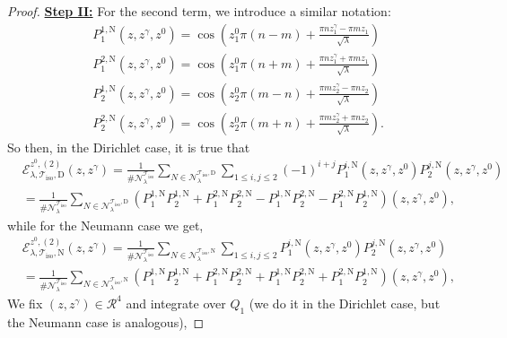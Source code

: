 \documentclass{amsart}
\theoremstyle{definition}
\theoremstyle{remark}
\renewcommand\leq\leqslant
\numberwithin{equation}{section}
\theoremstyle{definition}
\theoremstyle{remark}
\begin{document}
\begin{proof}
\textbf{	\underline{Step II:} }For the second term, we introduce a similar notation:
	\begin{equation}
		\begin{aligned}
			&	P_1^{1,\mathrm{N}}(z,z^\gamma,z^0)=\cos\left(z_1^0\pi(n-m)+\frac{\pi nz_1^\gamma-\pi mz_1}{\sqrt{\lambda}}\right) \\
			&	P_1^{2,\mathrm{N}}(z,z^\gamma,z^0)=\cos\left(z_1^0\pi(n+m)+\frac{\pi nz_1^\gamma+\pi mz_1}{\sqrt{\lambda}}\right) \\
			&	P_2^{1,\mathrm{N}}(z,z^\gamma,z^0)= \cos\left(z_2^0\pi(m-n)+\frac{\pi mz_2^\gamma-\pi nz_2}{\sqrt{\lambda}}\right)\\
			&	P_2^{2,\mathrm{N}}(z,z^\gamma,z^0)=\cos\left(z_2^0\pi(m+n)+\frac{\pi mz_2^\gamma+\pi nz_2}{\sqrt{\lambda}}\right) .
		\end{aligned}
	\end{equation} 
	So then, in the Dirichlet case, it is true that
	\begin{equation}
		\begin{aligned}
			&\mathcal{E}_{\lambda,\mathcal{T}_\mathrm{iso},\mathrm{D}}^{z^0,(2)}(z,z^\gamma)
			=\frac{1}{\#\mathcal{N}_\lambda^{\mathcal{T}_\mathrm{iso}}}\sum_{N\in\mathcal{N}_\lambda^{\mathcal{T}_\mathrm{iso},\mathrm{D}}}\sum_{1\leq i,j\leq 2}(-1)^{i+j}P_1^{i,\mathrm{N}}(z,z^\gamma,z^0)P_2^{j,\mathrm{N}}(z,z^\gamma,z^0)\\&=\frac{1}{\#\mathcal{N}_\lambda^{\mathcal{T}_\mathrm{iso}}}\sum_{N\in\mathcal{N}_\lambda^{\mathcal{T}_\mathrm{iso},\mathrm{D}}}\left(P_1^{1,\mathrm{N}}P_2^{1,\mathrm{N}}+P_1^{2,\mathrm{N}}P_2^{2,\mathrm{N}}-P_1^{1,\mathrm{N}}P_2^{2,\mathrm{N}}-P_1^{2,\mathrm{N}}P_2^{1,\mathrm{N}}\right)(z,z^\gamma,z^0),
		\end{aligned}
	\end{equation} while for the Neumann case we get, 
	\begin{equation}
		\begin{aligned}
			&\mathcal{E}_{\lambda,\mathcal{T}_\mathrm{iso},\mathrm{N}}^{z^0,(2)}(z,z^\gamma)
			=\frac{1}{\#\mathcal{N}_\lambda^{\mathcal{T}_\mathrm{iso}}}\sum_{N\in\mathcal{N}_\lambda^{\mathcal{T}_\mathrm{iso},\mathrm{N}}}\sum_{1\leq i,j\leq 2}P_1^{i,\mathrm{N}}(z,z^\gamma,z^0)P_2^{j,\mathrm{N}}(z,z^\gamma,z^0)\\&=\frac{1}{\#\mathcal{N}_\lambda^{\mathcal{T}_\mathrm{iso}}}\sum_{N\in\mathcal{N}_\lambda^{\mathcal{T}_\mathrm{iso},\mathrm{N}}}\left(P_1^{1,\mathrm{N}}P_2^{1,\mathrm{N}}+P_1^{2,\mathrm{N}}P_2^{2,\mathrm{N}}+P_1^{1,\mathrm{N}}P_2^{2,\mathrm{N}}+P_1^{2,\mathrm{N}}P_2^{1,\mathrm{N}}\right)(z,z^\gamma,z^0),
		\end{aligned}
	\end{equation} 
	We fix $(z,z^\gamma)\in \mathcal{R}^4$ and integrate over $Q_1$ (we do it in the Dirichlet case, but the Neumann case is analogous),
	

\end{proof}
\end{document}
